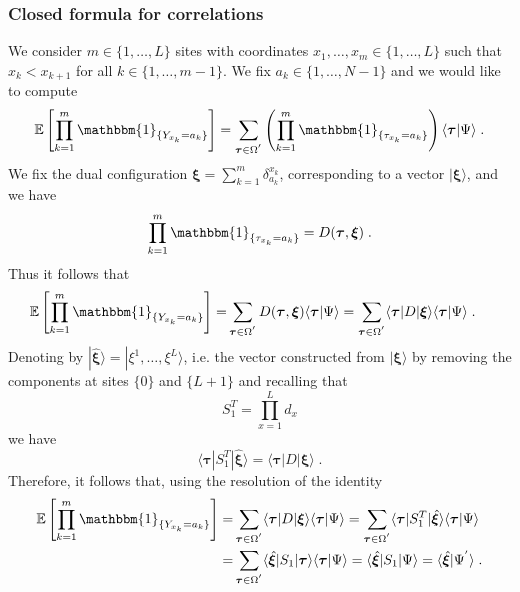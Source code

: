 \documentclass[10pt]{article}
\numberwithin{equation}{section}
\numberwithin{equation}{subsection}
\newcommand{\dt}{\;.}
\begin{document}
\subsubsection{Closed formula for correlations}\label{correlation-section}
We consider $m\in \{1,\ldots,L\}$ sites with coordinates $x_{1},\ldots,x_{m}\in \{1,\ldots,L\}$ such that $x_{k}<x_{k+1}$ for all $k\in \{1,\ldots,m-1\}$. We fix $a_{k}\in\{1,\ldots,N-1\}$ and we would like to compute
\begin{equation}
	\mathbb{E}\left[\prod_{k=1}^{m}\mathbbm{1}_{\{Y_{x_{k}}=a_{k}\}}\right]=\sum_{\bm{\tau}\in \Omega^{'}}\left(\prod_{k=1}^{m}\mathbbm{1}_{\{\tau_{x_{k}}=a_{k}\}}\right)\langle\bm{\tau}|\Psi\rangle\dt%
\end{equation}
We fix the dual configuration $\bm{\xi}=\sum_{k=1}^{m}\delta_{a_{k}}^{x_{k}}$, corresponding to a vector $|\bm{\xi}\rangle$, and we have 
\begin{equation}
	\prod_{k=1}^{m}\mathbbm{1}_{\{\tau_{x_{k}}=a_{k}\}}=D(\bm{\tau},\bm{\xi})\dt
\end{equation}
Thus it follows that 
\begin{align}
	\mathbb{E}\left[\prod_{k=1}^{m}\mathbbm{1}_{\{Y_{x_{k}}=a_{k}\}}\right]=&\sum_{\bm{\tau}\in \Omega^{'}}D(\bm{\tau},\bm{\xi})\langle\bm{\tau}|\Psi\rangle
	=\sum_{\bm{\tau}\in \Omega^{'}}\langle \bm{\tau}|D|\bm{\xi}\rangle\langle\bm{\tau}|\Psi\rangle\dt
\end{align}
Denoting by $|\hat{\bm{\xi}}\rangle=|\xi^{1},\ldots,\xi^{L}\rangle$, i.e. the vector constructed from $|\bm{\xi}\rangle$ by removing the components at sites $\{0\}$ and $\{L+1\}$ and recalling that  
\begin{equation}
	S_{1}^{T}=\prod_{x=1}^{L}d_{x}
\end{equation} 
we have
\begin{equation}
	\langle \bm{\tau}|S_{1}^{T}|\hat{\bm{\xi}}\rangle=\langle \bm{\tau}|D|\bm{\xi}\rangle \dt
\end{equation}
Therefore, it follows that, using the resolution of the identity
\begin{align}
\label{corr-psi1}
	\mathbb{E}\left[\prod_{k=1}^{m}\mathbbm{1}_{\{Y_{x_{k}}=a_{k}\}}\right]=& \sum_{\bm{\tau}\in \Omega^{'}}\langle \bm{\tau}|D|\bm{\xi}\rangle\langle\bm{\tau}|\Psi\rangle
	=\sum_{\bm{\tau}\in \Omega^{'}}\langle \bm{\tau}|S_{1}^{T}|\hat{\bm{\xi}}\rangle\langle\bm{\tau}|\Psi\rangle\nonumber\\
	=&\sum_{\bm{\tau}\in \Omega^{'}}\langle \hat{\bm{\xi}}|S_{1}|\bm{\tau}\rangle\langle\bm{\tau}|\Psi\rangle
	=\langle \hat{\bm{\xi}}|S_{1}|\Psi\rangle
	=\langle \hat{\bm{\xi}}|\Psi^{'}\rangle\dt
\end{align}
\end{document}
